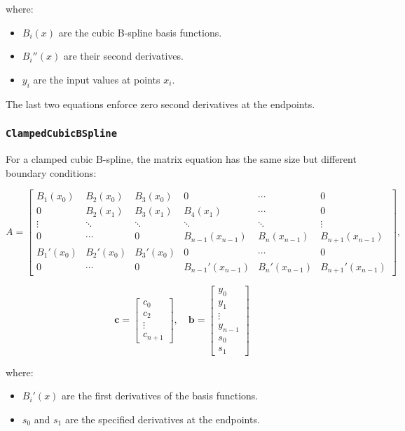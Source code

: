 \documentclass{article}
\begin{document}
where:

\begin{itemize}
  \item \(B_i(x)\) are the cubic B-spline basis functions.
  \item \(B_i''(x)\) are their second derivatives.
  \item \(y_i\) are the input values at points \(x_i\).
\end{itemize}

The last two equations enforce zero second derivatives at the endpoints.

\subsubsection{\texttt{ClampedCubicBSpline}}
For a clamped cubic B-spline, the matrix equation has the same size but different boundary conditions:

\[
A = \begin{bmatrix}
B_1(x_0) & B_2(x_0) & B_3(x_0) & 0 & \cdots & 0 \\
0 & B_2(x_1) & B_3(x_1) & B_4(x_1) & \cdots & 0 \\
\vdots & \ddots & \ddots & \ddots & \ddots & \vdots \\
0 & \cdots & 0 & B_{n-1}(x_{n-1}) & B_n(x_{n-1}) & B_{n+1}(x_{n-1}) \\
B_1'(x_0) & B_2'(x_0) & B_3'(x_0) & 0 & \cdots & 0 \\
0 & \cdots & 0 & B_{n-1}'(x_{n-1}) & B_n'(x_{n-1}) & B_{n+1}'(x_{n-1})
\end{bmatrix},
\]

\[
\mathbf{c} = \begin{bmatrix} c_0 \\ c_2 \\ \vdots \\ c_{n+1} \end{bmatrix}, \quad
\mathbf{b} = \begin{bmatrix} y_0 \\ y_1 \\ \vdots \\ y_{n-1} \\ s_0 \\ s_1 \end{bmatrix}
\]

where:

\begin{itemize}
  \item \(B_i'(x)\) are the first derivatives of the basis functions.
  \item \(s_0\) and \(s_1\) are the specified derivatives at the endpoints.
\end{itemize}
\end{document}
